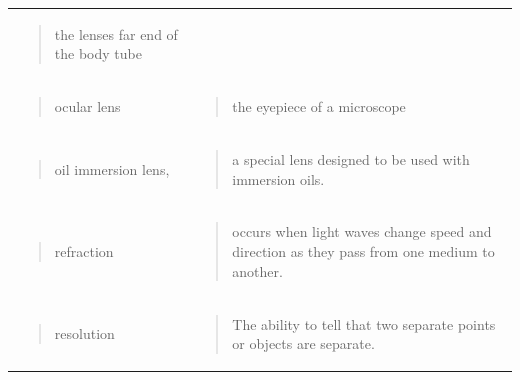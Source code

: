 \documentclass[
  letterpaper,
  DIV=11,
  numbers=noendperiod]{scrreprt}
\begin{document}
{\begin{longtable}[]{@{}
  >{\centering\arraybackslash}p{}
  >{\centering\arraybackslash}p{}@{}}
\begin{minipage}[t]{\linewidth}
\begin{quote}
the lenses far end of the body tube
\end{quote}
\end{minipage} \\
\begin{minipage}[t]{\linewidth}\centering
\begin{quote}
ocular lens
\end{quote}
\end{minipage} & \begin{minipage}[t]{\linewidth}\centering
\begin{quote}
the eyepiece of a microscope
\end{quote}
\end{minipage} \\
\begin{minipage}[t]{\linewidth}\centering
\begin{quote}
oil immersion lens,
\end{quote}
\end{minipage} & \begin{minipage}[t]{\linewidth}\centering
\begin{quote}
a special lens designed to be used with immersion oils.
\end{quote}
\end{minipage} \\
\begin{minipage}[t]{\linewidth}\centering
\begin{quote}
refraction
\end{quote}
\end{minipage} & \begin{minipage}[t]{\linewidth}\centering
\begin{quote}
occurs when light waves change speed and direction as they pass from one
medium to another.
\end{quote}
\end{minipage} \\
\begin{minipage}[t]{\linewidth}\centering
\begin{quote}
resolution
\end{quote}
\end{minipage} & \begin{minipage}[t]{\linewidth}\centering
\begin{quote}
The ability to tell that two separate points or objects are separate.
\end{quote}
\end{minipage} \\

\end{longtable}}
\end{document}
